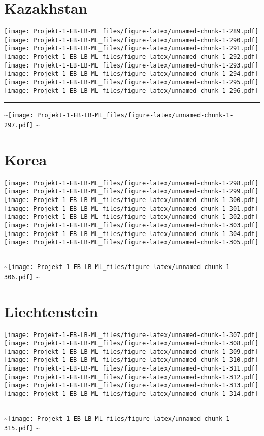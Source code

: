 \documentclass[]{article}
\begin{document}
\section{Kazakhstan}\label{kazakhstan}

\texttt{[image: Projekt-1-EB-LB-ML\_files/figure-latex/unnamed-chunk-1-289.pdf]}
\texttt{[image: Projekt-1-EB-LB-ML\_files/figure-latex/unnamed-chunk-1-290.pdf]}
\texttt{[image: Projekt-1-EB-LB-ML\_files/figure-latex/unnamed-chunk-1-291.pdf]}
\texttt{[image: Projekt-1-EB-LB-ML\_files/figure-latex/unnamed-chunk-1-292.pdf]}
\texttt{[image: Projekt-1-EB-LB-ML\_files/figure-latex/unnamed-chunk-1-293.pdf]}
\texttt{[image: Projekt-1-EB-LB-ML\_files/figure-latex/unnamed-chunk-1-294.pdf]}
\texttt{[image: Projekt-1-EB-LB-ML\_files/figure-latex/unnamed-chunk-1-295.pdf]}
\texttt{[image: Projekt-1-EB-LB-ML\_files/figure-latex/unnamed-chunk-1-296.pdf]}
\bigskip\hrule\bigskip
\textasciitilde{}\hfill\texttt{[image: Projekt-1-EB-LB-ML\_files/figure-latex/unnamed-chunk-1-297.pdf]}
\hfill \textasciitilde{} \vfill\eject

\section{Korea}\label{korea}

\texttt{[image: Projekt-1-EB-LB-ML\_files/figure-latex/unnamed-chunk-1-298.pdf]}
\texttt{[image: Projekt-1-EB-LB-ML\_files/figure-latex/unnamed-chunk-1-299.pdf]}
\texttt{[image: Projekt-1-EB-LB-ML\_files/figure-latex/unnamed-chunk-1-300.pdf]}
\texttt{[image: Projekt-1-EB-LB-ML\_files/figure-latex/unnamed-chunk-1-301.pdf]}
\texttt{[image: Projekt-1-EB-LB-ML\_files/figure-latex/unnamed-chunk-1-302.pdf]}
\texttt{[image: Projekt-1-EB-LB-ML\_files/figure-latex/unnamed-chunk-1-303.pdf]}
\texttt{[image: Projekt-1-EB-LB-ML\_files/figure-latex/unnamed-chunk-1-304.pdf]}
\texttt{[image: Projekt-1-EB-LB-ML\_files/figure-latex/unnamed-chunk-1-305.pdf]}
\bigskip\hrule\bigskip
\textasciitilde{}\hfill\texttt{[image: Projekt-1-EB-LB-ML\_files/figure-latex/unnamed-chunk-1-306.pdf]}
\hfill \textasciitilde{} \vfill\eject

\section{Liechtenstein}\label{liechtenstein}

\texttt{[image: Projekt-1-EB-LB-ML\_files/figure-latex/unnamed-chunk-1-307.pdf]}
\texttt{[image: Projekt-1-EB-LB-ML\_files/figure-latex/unnamed-chunk-1-308.pdf]}
\texttt{[image: Projekt-1-EB-LB-ML\_files/figure-latex/unnamed-chunk-1-309.pdf]}
\texttt{[image: Projekt-1-EB-LB-ML\_files/figure-latex/unnamed-chunk-1-310.pdf]}
\texttt{[image: Projekt-1-EB-LB-ML\_files/figure-latex/unnamed-chunk-1-311.pdf]}
\texttt{[image: Projekt-1-EB-LB-ML\_files/figure-latex/unnamed-chunk-1-312.pdf]}
\texttt{[image: Projekt-1-EB-LB-ML\_files/figure-latex/unnamed-chunk-1-313.pdf]}
\texttt{[image: Projekt-1-EB-LB-ML\_files/figure-latex/unnamed-chunk-1-314.pdf]}
\bigskip\hrule\bigskip
\textasciitilde{}\hfill\texttt{[image: Projekt-1-EB-LB-ML\_files/figure-latex/unnamed-chunk-1-315.pdf]}
\hfill \textasciitilde{} \vfill\eject
\end{document}
